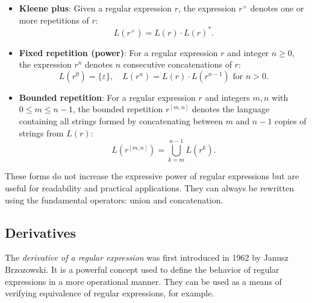 \begin{itemize}
    \item \textbf{Kleene plus}: Given a regular expression $r$, the expression $r^+$ denotes one or more repetitions of $r$:
    \[
    L(r^+) = L(r) \cdot L(r)^*.
    \]

    \item \textbf{Fixed repetition (power)}: For a regular expression $r$ and integer $n \geq 0$, the expression $r^n$ denotes $n$ consecutive concatenations of $r$:
    \[
    L(r^0) = \{ \varepsilon \}, \quad L(r^n) = L(r) \cdot L(r^{n-1}) \text{ for } n > 0.
    \]

	 \item \textbf{Bounded repetition}: For a regular expression $r$ and integers $m, n$ with $0 \leq m \leq n-1$, the bounded repetition $r^{[m,n]}$ denotes the language containing all strings formed by concatenating between $m$ and $n-1$ copies of strings from $L(r)$:
    \[
    L(r^{[m,n]}) = \bigcup_{k=m}^{n-1} L(r^k).
    \]
\end{itemize}

These forms do not increase the expressive power of regular expressions but are useful for readability and practical applications. They can always be rewritten using the fundamental operators: union and concatenation.

\subsection{Derivatives}
\label{chap:prelim:derivatives}
The \emph{derivative of a regular expression} was first introduced in 1962 by Janusz Brzozowski. It is a powerful concept used to define the behavior of regular expressions in a more operational manner. They can be used as a means of verifying equivalence of regular expressions, for example.

